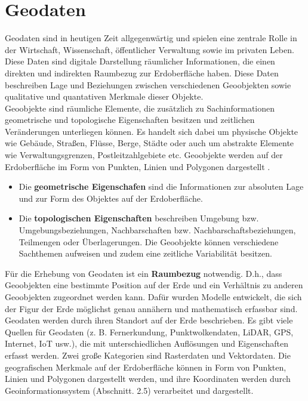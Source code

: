 \section{Geodaten}

Geodaten sind in heutigen Zeit allgegenwärtig und spielen eine zentrale Rolle in der Wirtschaft, Wissenschaft, öffentlicher Verwaltung sowie im privaten Leben. Diese Daten sind digitale Darstellung räumlicher Informationen, die einen direkten und indirekten Raumbezug zur Erdoberfläche haben. Diese Daten beschreiben Lage und Beziehungen zwischen verschiedenen Geoobjekten sowie qualitative und quantativen Merkmale dieser Objekte.\\

Geoobjekte sind räumliche Elemente, die zusätzlich zu Sachinformationen geometrische und topologische Eigenschaften besitzen und zeitlichen Veränderungen unterliegen können. Es handelt sich dabei um physische Objekte wie Gebäude, Straßen, Flüsse, Berge, Städte oder auch um abstrakte Elemente wie Verwaltungsgrenzen, Postleitzahlgebiete etc. Geoobjekte werden auf der Erdoberfläche im Form von Punkten, Linien und Polygonen dargestellt \citep{de_lange_geoinformatik_2020}.

\begin{itemize}
    \item Die \textbf{geometrische Eigenschafen} sind die Informationen zur absoluten Lage und zur Form des Objektes auf der Erdoberfläche.
    \item Die \textbf{topologischen Eigenschaften} beschreiben Umgebung bzw. Umgebungsbeziehungen, Nachbarschaften bzw. Nachbarschaftsbeziehungen, Teilmengen oder Überlagerungen. Die Geoobjekte können verschiedene Sachthemen aufweisen und zudem eine zeitliche Variabilität besitzen.
\end{itemize}

Für die Erhebung von Geodaten ist ein \textbf{Raumbezug} notwendig. D.h., dass Geoobjekten eine bestimmte Position auf der Erde und ein Verhältnis zu anderen Geoobjekten zugeordnet werden kann. Dafür wurden Modelle entwickelt, die sich der Figur der Erde möglichst genau annähern und mathematisch erfassbar sind. \\

Geodaten werden durch ihren Standort auf der Erde beschrieben. Es gibt viele Quellen für Geodaten (z. B. Fernerkundung, Punktwolkendaten, LiDAR, GPS, Internet, IoT usw.), die mit unterschiedlichen Auflösungen und Eigenschaften erfasst werden. Zwei große Kategorien sind Rasterdaten und Vektordaten. Die geografischen Merkmale auf der Erdoberfläche können in Form von Punkten, Linien und Polygonen dargestellt werden, und ihre Koordinaten werden durch Geoinformationssystem (Abschnitt. 2.5) verarbeitet und dargestellt.\\


